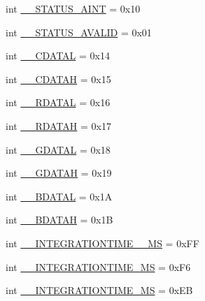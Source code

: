 \begin{DoxyCompactItemize}
\item 
int \hyperlink{classlibsensorPy_1_1concretesensor_1_1tcs34725_1_1TCS34725_a6cadcfc0517e2619d5cd16ef45c6ca29}{\+\_\+\+\_\+\+S\+T\+A\+T\+U\+S\+\_\+\+A\+I\+N\+T} = 0x10
\item 
int \hyperlink{classlibsensorPy_1_1concretesensor_1_1tcs34725_1_1TCS34725_a4dc5dbce9f440f4b0932f60136340ec2}{\+\_\+\+\_\+\+S\+T\+A\+T\+U\+S\+\_\+\+A\+V\+A\+L\+I\+D} = 0x01
\item 
int \hyperlink{classlibsensorPy_1_1concretesensor_1_1tcs34725_1_1TCS34725_a95bba008191a06bde529d1de4d37584c}{\+\_\+\+\_\+\+C\+D\+A\+T\+A\+L} = 0x14
\item 
int \hyperlink{classlibsensorPy_1_1concretesensor_1_1tcs34725_1_1TCS34725_a450a4f7fcd61dfe178256d3705cac94c}{\+\_\+\+\_\+\+C\+D\+A\+T\+A\+H} = 0x15
\item 
int \hyperlink{classlibsensorPy_1_1concretesensor_1_1tcs34725_1_1TCS34725_ac612448869be0d38225c05de0264d517}{\+\_\+\+\_\+\+R\+D\+A\+T\+A\+L} = 0x16
\item 
int \hyperlink{classlibsensorPy_1_1concretesensor_1_1tcs34725_1_1TCS34725_a8440f82c8779292ade4992ca56b21720}{\+\_\+\+\_\+\+R\+D\+A\+T\+A\+H} = 0x17
\item 
int \hyperlink{classlibsensorPy_1_1concretesensor_1_1tcs34725_1_1TCS34725_a82e6c7fb809fcd33cababd77f6404e42}{\+\_\+\+\_\+\+G\+D\+A\+T\+A\+L} = 0x18
\item 
int \hyperlink{classlibsensorPy_1_1concretesensor_1_1tcs34725_1_1TCS34725_aa44208af1e2d0d14dbbe5f15c60ed3fa}{\+\_\+\+\_\+\+G\+D\+A\+T\+A\+H} = 0x19
\item 
int \hyperlink{classlibsensorPy_1_1concretesensor_1_1tcs34725_1_1TCS34725_ac7133b2a7c3abed6fcf4d7ce0d2722ef}{\+\_\+\+\_\+\+B\+D\+A\+T\+A\+L} = 0x1\+A
\item 
int \hyperlink{classlibsensorPy_1_1concretesensor_1_1tcs34725_1_1TCS34725_ad61ae5ff3f7f1f3468163386818f1b2d}{\+\_\+\+\_\+\+B\+D\+A\+T\+A\+H} = 0x1\+B
\item 
int \hyperlink{classlibsensorPy_1_1concretesensor_1_1tcs34725_1_1TCS34725_a76f28b5220251459dd8959c0814962af}{\+\_\+\+\_\+\+I\+N\+T\+E\+G\+R\+A\+T\+I\+O\+N\+T\+I\+M\+E\+\_\+\_\+M\+S} = 0x\+F\+F
\item 
int \hyperlink{classlibsensorPy_1_1concretesensor_1_1tcs34725_1_1TCS34725_a120c59d306054887b8fd7ee65cfde94c}{\+\_\+\+\_\+\+I\+N\+T\+E\+G\+R\+A\+T\+I\+O\+N\+T\+I\+M\+E\+\_\+M\+S} = 0x\+F6
\item 
int \hyperlink{classlibsensorPy_1_1concretesensor_1_1tcs34725_1_1TCS34725_a61ea1074dfc41795af719da710e31446}{\+\_\+\+\_\+\+I\+N\+T\+E\+G\+R\+A\+T\+I\+O\+N\+T\+I\+M\+E\+\_\+M\+S} = 0x\+E\+B

\end{DoxyCompactItemize}
